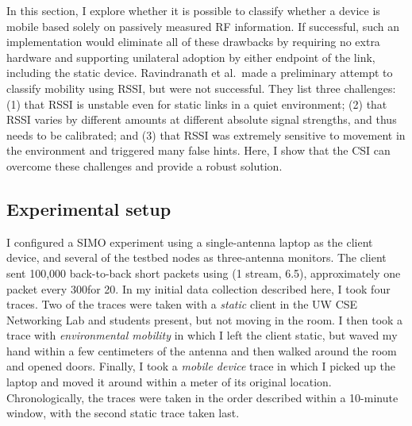 In this section, I explore whether it is possible to classify whether a device is mobile based solely on passively measured RF information. If successful, such an implementation would eliminate all of these drawbacks by requiring no extra hardware and supporting unilateral adoption by either endpoint of the link, including the static device. Ravindranath et al.\ made a preliminary attempt to classify mobility using RSSI, but were not successful. They list three challenges: (1) that RSSI is unstable even for static links in a quiet environment; (2) that RSSI varies by different amounts at different absolute signal strengths, and thus needs to be calibrated; and (3) that RSSI was extremely sensitive to movement in the environment and triggered many false hints. Here, I show that the CSI can overcome these challenges and provide a robust solution.

\subsection{Experimental setup}
I configured a SIMO experiment using a single-antenna laptop as the client device, and several of the testbed nodes as three-antenna monitors. The client sent 100,000 back-to-back short packets using  (1 stream, 6.5\Mbps), approximately one packet every 300\us for 20\s. In my initial data collection described here, I took four traces. Two of the traces were taken with a \emph{static} client in the UW CSE Networking Lab and students present, but not moving in the room. I then took a trace with \emph{environmental mobility} in which I left the client static, but waved my hand within a few centimeters of the antenna and then walked around the room and opened doors. Finally, I took a \emph{mobile device} trace in which I picked up the laptop and moved it around within a meter of its original location. Chronologically, the traces were taken in the order described within a 10-minute window, with the second static trace taken last. 

